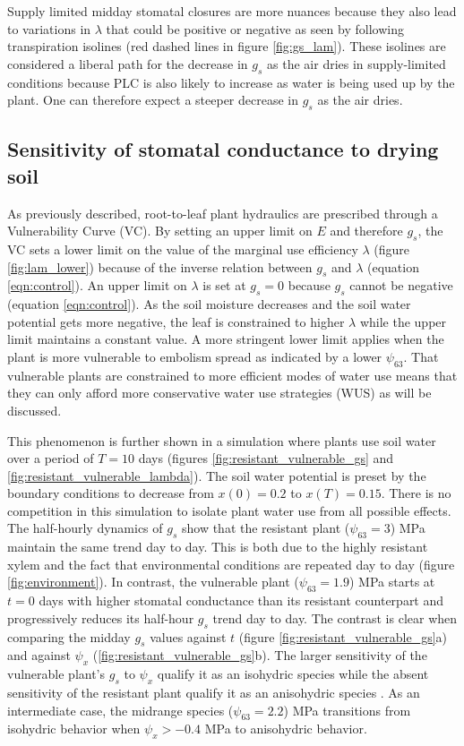 \documentclass[utf8]{frontiersSCNS} %
\begin{document}
Supply limited midday stomatal closures are more nuances because they also lead to variations in $\lambda$ that could be positive or negative as seen by following transpiration isolines (red dashed lines in figure \ref{fig:gs_lam}). These isolines are considered a liberal path for the decrease in $g_s$ as the air dries in supply-limited conditions because PLC is also likely to increase as water is being used up by the plant. One can therefore expect a steeper decrease in $g_s$ as the air dries.

\subsection{Sensitivity of stomatal conductance to drying soil}

As previously described, root-to-leaf plant hydraulics are prescribed through a Vulnerability Curve (VC). By setting an upper limit on $E$ and therefore $g_s$, the VC sets a lower limit on the value of the marginal use efficiency $\lambda$ (figure \ref{fig:lam_lower}) because of the inverse relation between $g_s$ and $\lambda$ (equation \ref{eqn:control}). An upper limit on $\lambda$ is set at $g_s=0$ because $g_s$ cannot be negative (equation \ref{eqn:control}). As the soil moisture decreases and the soil water potential gets more negative, the leaf is constrained to higher $\lambda$ while the upper limit maintains a constant value. A more stringent lower limit applies when the plant is more vulnerable to embolism spread as indicated by a lower $\psi_{63}$. That vulnerable plants are constrained to more efficient modes of water use means that they can only afford more conservative water use strategies (WUS) as will be discussed.



This phenomenon is further shown in a simulation where plants use soil water over a period of $T=10$ days (figures \ref{fig:resistant_vulnerable_gs} and \ref{fig:resistant_vulnerable_lambda}). The soil water potential is preset by the boundary conditions to decrease from $x(0)=0.2$ to $x(T)=0.15$. There is no competition in this simulation to isolate plant water use from all possible effects. The half-hourly dynamics of $g_s$ show that the resistant plant ($\psi_{63}=3$) MPa maintain the same trend day to day. This is both due to the highly resistant xylem and the fact that environmental conditions are repeated day to day (figure \ref{fig:environment}). In contrast, the vulnerable plant ($\psi_{63}=1.9$) MPa starts at $t=0$ days with higher stomatal conductance than its resistant counterpart and progressively reduces its half-hour $g_s$ trend day to day. The contrast is clear when comparing the midday $g_s$ values against $t$ (figure \ref{fig:resistant_vulnerable_gs}a) and against $\psi_x$ (\ref{fig:resistant_vulnerable_gs}b). The larger sensitivity of the vulnerable plant's $g_s$ to $\psi_x$ qualify it as an isohydric species while the absent sensitivity of the resistant plant qualify it as an anisohydric species \citep{Hochberg2017}. As an intermediate case, the midrange species ($\psi_{63}=2.2$) MPa transitions from isohydric behavior when $\psi_x>-0.4$ MPa to anisohydric behavior.
\end{document}
